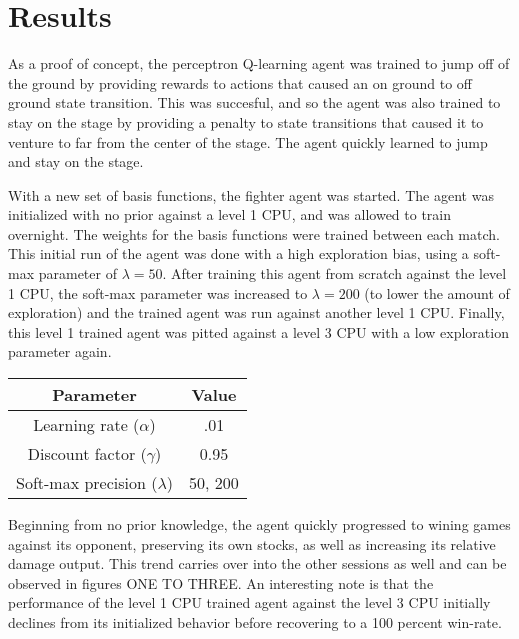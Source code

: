 \section{Results}

As a proof of concept, the perceptron Q-learning agent was trained to jump off of the ground by providing rewards to actions that caused an on ground to off ground state transition. This was succesful, and so the agent was also trained to stay on the stage by providing a penalty to state transitions that caused it to venture to far from the center of the stage. The agent quickly learned to jump and stay on the stage.

With a new set of basis functions, the fighter agent was started. The agent was initialized with no prior against a level 1 CPU, and was allowed to train overnight. The weights for the basis functions were trained between each match. This initial run of the agent was done with a high exploration bias, using a soft-max parameter of $\lambda = 50$. After training this agent from scratch against the level 1 CPU, the soft-max parameter was increased to $\lambda = 200$ (to lower the amount of exploration) and the trained agent was run against another level 1 CPU. Finally, this level 1 trained agent was pitted against a level 3 CPU with a low exploration parameter again.

\begin{center}
\begin{tabular}{| c | c | }
\hline
 Parameter & Value \\ 
 \hline\hline
 Learning rate ($\alpha$) & .01  \\  
 \hline
 Discount factor ($\gamma$) & 0.95 \\  
 \hline
 Soft-max precision ($\lambda$) & 50, 200 \\    
 \hline
\end{tabular}
\end{center}


Beginning from no prior knowledge, the agent quickly progressed to wining games against its opponent, preserving its own stocks, as well as increasing its relative damage output. This trend carries over into the other sessions as well and can be observed in figures ONE TO THREE. An interesting note is that the performance of the level 1 CPU trained agent against the level 3 CPU initially declines from its initialized behavior before recovering to a 100 percent win-rate. 


